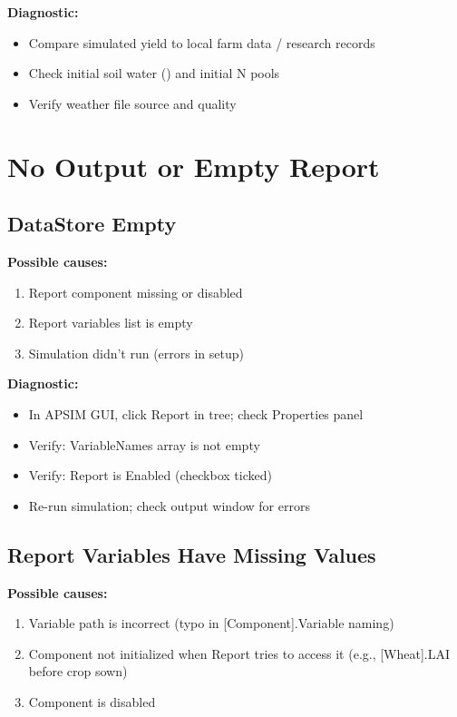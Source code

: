 \textbf{Diagnostic:}
\begin{itemize}
  \item Compare simulated yield to local farm data / research records
  \item Check initial soil water () and initial N pools
  \item Verify weather file source and quality
\end{itemize}

\section{No Output or Empty Report}

\subsection{DataStore Empty}

\begin{warningbox}
\textbf{Possible causes:}
\begin{enumerate}
  \item Report component missing or disabled
  \item Report variables list is empty
  \item Simulation didn't run (errors in setup)
\end{enumerate}
\end{warningbox}

\textbf{Diagnostic:}
\begin{itemize}
  \item In APSIM GUI, click Report in tree; check Properties panel
  \item Verify: VariableNames array is not empty
  \item Verify: Report is Enabled (checkbox ticked)
  \item Re-run simulation; check output window for errors
\end{itemize}

\subsection{Report Variables Have Missing Values}

\begin{warningbox}
\textbf{Possible causes:}
\begin{enumerate}
  \item Variable path is incorrect (typo in [Component].Variable naming)
  \item Component not initialized when Report tries to access it (e.g., [Wheat].LAI before crop sown)
  \item Component is disabled
\end{enumerate}
\end{warningbox}

